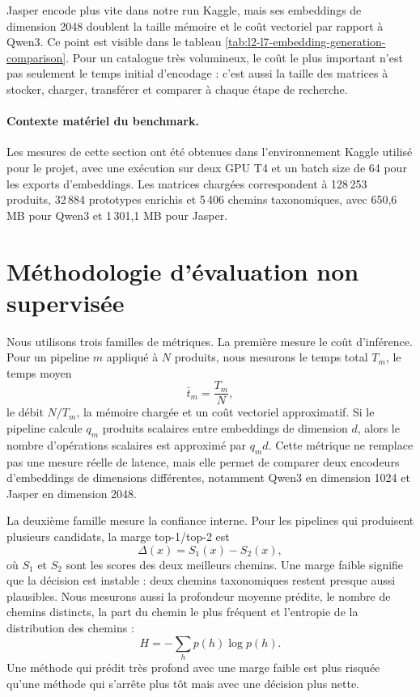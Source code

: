 \documentclass[12pt,a4paper]{report}
\begin{document}
Jasper encode plus vite dans notre run Kaggle, mais ses embeddings de dimension 2048 doublent la taille mémoire et le coût vectoriel par rapport à Qwen3. Ce point est visible dans le tableau \ref{tab:l2-l7-embedding-generation-comparison}. Pour un catalogue très volumineux, le coût le plus important n'est pas seulement le temps initial d'encodage : c'est aussi la taille des matrices à stocker, charger, transférer et comparer à chaque étape de recherche.

\paragraph{Contexte matériel du benchmark.}
Les mesures de cette section ont été obtenues dans l'environnement Kaggle utilisé pour le projet, avec une exécution sur deux GPU T4 et un batch size de 64 pour les exports d'embeddings. Les matrices chargées correspondent à 128\,253 produits, 32\,884 prototypes enrichis et 5\,406 chemins taxonomiques, avec 650{,}6 MB pour Qwen3 et 1\,301{,}1 MB pour Jasper.

\section{Méthodologie d'évaluation non supervisée}
\label{sec:l2-l7-unsupervised-metrics}

Nous utilisons trois familles de métriques. La première mesure le coût d'inférence. Pour un pipeline $m$ appliqué à $N$ produits, nous mesurons le temps total $T_m$, le temps moyen
\begin{equation}
    \bar{t}_m=\frac{T_m}{N},
\end{equation}
le débit $N/T_m$, la mémoire chargée et un coût vectoriel approximatif. Si le pipeline calcule $q_m$ produits scalaires entre embeddings de dimension $d$, alors le nombre d'opérations scalaires est approximé par $q_m d$. Cette métrique ne remplace pas une mesure réelle de latence, mais elle permet de comparer deux encodeurs d'embeddings de dimensions différentes, notamment Qwen3 en dimension 1024 et Jasper en dimension 2048.

La deuxième famille mesure la confiance interne. Pour les pipelines qui produisent plusieurs candidats, la marge top-1/top-2 est
\begin{equation}
    \Delta(x)=S_1(x)-S_2(x),
\end{equation}
où $S_1$ et $S_2$ sont les scores des deux meilleurs chemins. Une marge faible signifie que la décision est instable : deux chemins taxonomiques restent presque aussi plausibles. Nous mesurons aussi la profondeur moyenne prédite, le nombre de chemins distincts, la part du chemin le plus fréquent et l'entropie de la distribution des chemins :
\begin{equation}
    H=-\sum_h p(h)\log p(h).
\end{equation}
Une méthode qui prédit très profond avec une marge faible est plus risquée qu'une méthode qui s'arrête plus tôt mais avec une décision plus nette.
\end{document}
